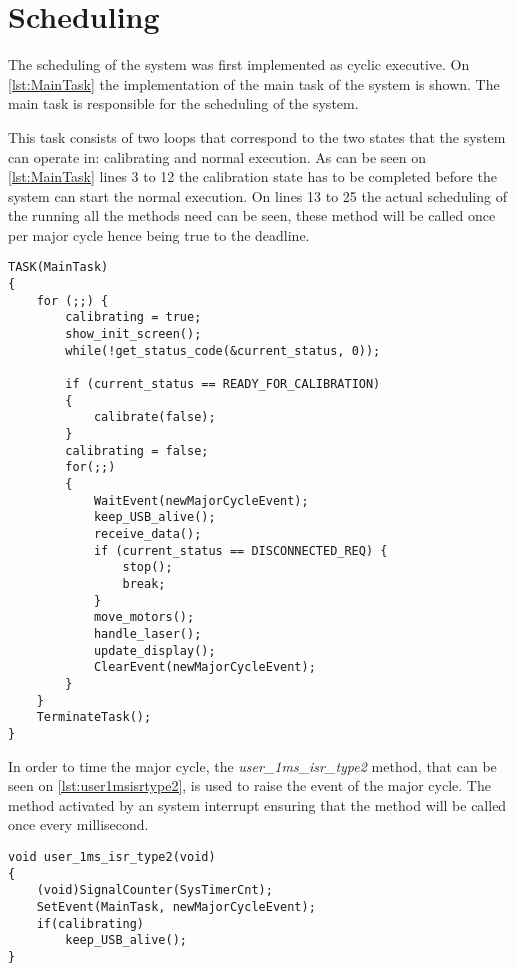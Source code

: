 \section{Scheduling}\label{solution:scheduling}
The scheduling of the system was first implemented as cyclic executive.
On \autoref{lst:MainTask} the implementation of the main task of the system is shown.
The main task is responsible for the scheduling of the system.

This task consists of two loops that correspond to the two states that the system can operate in: calibrating and normal execution.
As can be seen on \autoref{lst:MainTask} lines 3 to 12 the calibration state has to be completed before the system can start the normal execution.
On lines 13 to 25 the actual scheduling of the running all the methods need can be seen, these method will be called once per major cycle hence being true to the deadline.

\begin{lstlisting}[language=CSharp,label={lst:MainTask},caption={MainTaks method from logic.c}]
TASK(MainTask)
{
    for (;;) {
        calibrating = true;
        show_init_screen();
        while(!get_status_code(&current_status, 0));

        if (current_status == READY_FOR_CALIBRATION)
        {
            calibrate(false);
        }
        calibrating = false;
        for(;;)
        {
            WaitEvent(newMajorCycleEvent);
            keep_USB_alive();
            receive_data();
            if (current_status == DISCONNECTED_REQ) {
                stop();
                break;
            }
            move_motors();
            handle_laser();
            update_display();
            ClearEvent(newMajorCycleEvent);
        }
    }
    TerminateTask();
}
\end{lstlisting}

In order to time the major cycle, the \textit{user\_1ms\_isr\_type2} method, that can be seen on \autoref{lst:user1msisrtype2}, is used to raise the event of the major cycle.
The method activated by an system interrupt ensuring that the method will be called once every millisecond.
\begin{lstlisting}[language=CSharp,label={lst:user1msisrtype2},caption={user\_1ms\_isr\_type2 method from nxt.c}]
void user_1ms_isr_type2(void)
{
    (void)SignalCounter(SysTimerCnt);
    SetEvent(MainTask, newMajorCycleEvent);
    if(calibrating)
        keep_USB_alive();
}
\end{lstlisting}

